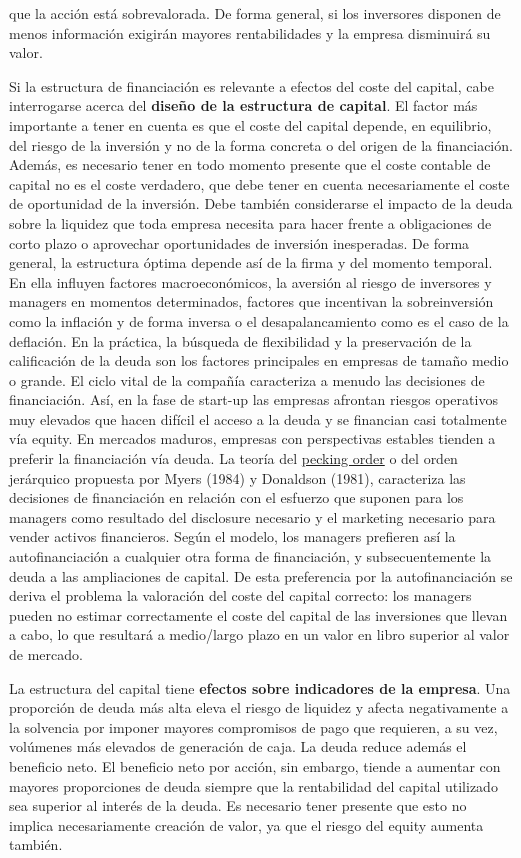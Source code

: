 \documentclass{nuevotema}
\begin{document}
que la acción está sobrevalorada. De forma general, si los inversores disponen de menos información exigirán mayores rentabilidades y la empresa disminuirá su valor.

Si la estructura de financiación es relevante a efectos del coste del capital, cabe interrogarse acerca del \textbf{diseño de la estructura de capital}. El factor más importante a tener en cuenta es que el coste del capital depende, en equilibrio, del riesgo de la inversión y no de la forma concreta o del origen de la financiación. Además, es necesario tener en todo momento presente que el coste contable de capital no es el coste verdadero, que debe tener en cuenta necesariamente el coste de oportunidad de la inversión. Debe también considerarse el impacto de la deuda sobre la liquidez que toda empresa necesita para hacer frente a obligaciones de corto plazo o aprovechar oportunidades de inversión inesperadas. De forma general, la estructura óptima depende así de la firma y del momento temporal. En ella influyen factores macroeconómicos, la aversión al riesgo de inversores y managers en momentos determinados, factores que incentivan la sobreinversión como la inflación y de forma inversa o el desapalancamiento como es el caso de la deflación. En la práctica, la búsqueda de flexibilidad y la preservación de la calificación de la deuda son los factores principales en empresas de tamaño medio o grande. El ciclo vital de la compañía caracteriza a menudo las decisiones de financiación. Así, en la fase de start-up las empresas afrontan riesgos operativos muy elevados que hacen difícil el acceso a la deuda y se financian casi totalmente vía equity. En mercados maduros, empresas con perspectivas estables tienden a preferir la financiación vía deuda. La teoría del \underline{pecking order} o del orden jerárquico propuesta por Myers (1984) y Donaldson (1981), caracteriza las decisiones de financiación en relación con el esfuerzo que suponen para los managers como resultado del disclosure necesario y el marketing necesario para vender activos financieros. Según el modelo, los managers prefieren así la autofinanciación a cualquier otra forma de financiación, y subsecuentemente la deuda a las ampliaciones de capital. De esta preferencia por la autofinanciación se deriva el problema la valoración del coste del capital correcto: los managers pueden no estimar correctamente el coste del capital de las inversiones que llevan a cabo, lo que resultará a medio/largo plazo en un valor en libro superior al valor de mercado.

La estructura del capital tiene \textbf{efectos sobre indicadores de la empresa}. Una proporción de deuda más alta eleva el riesgo de liquidez y afecta negativamente a la solvencia por imponer mayores compromisos de pago que requieren, a su vez, volúmenes más elevados de generación de caja. La deuda reduce además el beneficio neto. El beneficio neto por acción, sin embargo, tiende a aumentar con mayores proporciones de deuda siempre que la rentabilidad del capital utilizado sea superior al interés de la deuda. Es necesario tener presente que esto no implica necesariamente creación de valor, ya que el riesgo del equity aumenta también.
\end{document}
